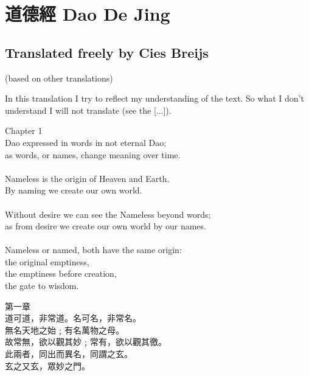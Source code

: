 \documentclass[10pt,a4paper]{book}
\begin{document}
\frontmatter


\chapter*{道德經 Dao De Jing}
\thispagestyle{empty}

\section*{\huge \center Translated freely by Cies Breijs}

\newpage
(based on other translations)

In this translation I try to reflect my understanding of the text.
So what I don't understand I will not translate (see the [...]).


\mainmatter

\begin{multicols}{2}
{\huge Chapter 1}
\vspace{15pt}
\\
Dao expressed in words in not eternal Dao;\\
as words, or names, change meaning over time.\\
\\
Nameless is the origin of Heaven and Earth.\\
By naming we create our own world.\\
\\
Without desire we can see the Nameless beyond words;\\
as from desire we create our own world by our names.\\
\\
Nameless or named, both have the same origin:\\
the original emptiness,\\
the emptiness before creation,\\
the gate to wisdom.\\

\columnbreak

\setRL
{\huge 第一章}
\vspace{15pt}
\\
道可道，非常道。名可名，非常名。\\
無名天地之始﹔有名萬物之母。\\
故常無，欲以觀其妙﹔常有，欲以觀其徼。\\
此兩者，同出而異名，同謂之玄。\\
玄之又玄，眾妙之門。
\end{multicols}
\end{document}
